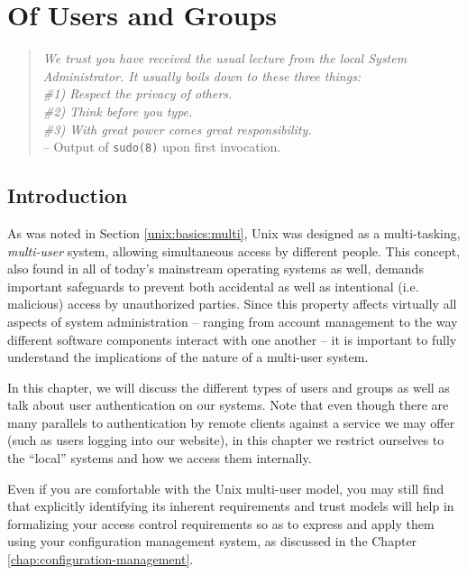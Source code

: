 \chapter{Of Users and Groups}
\label{chap:multi-user}

\begin{quote}

{\em We trust you have received the usual lecture from
the local System Administrator. It usually boils down
to these three things:\\
\#1) Respect the privacy of others.\\
\#2) Think before you type.\\
\#3) With great power comes great responsibility.} \\
-- Output of {\tt sudo(8)} upon first invocation.
\end{quote}


\section{Introduction}
\label{multi-user:introduction}

As was noted in Section \ref{unix:basics:multi}, Unix
was designed as a multi-tasking, {\em multi-user}
system, allowing simultaneous access by different
people.  This concept, also found in all of today's
mainstream operating systems as well, demands
important safeguards to prevent both accidental as
well as intentional (i.e. malicious) access by
unauthorized parties.  Since this property affects
virtually all aspects of system administration --
ranging from account management to the way different
software components interact with one another -- it is
important to fully understand the implications of the
nature of a multi-user system.

In this chapter, we will discuss the different types
of users and groups as well as talk about user
authentication on our systems.  Note that even though
there are many parallels to authentication by remote
clients against a service we may offer (such as users
logging into our website), in this chapter we restrict
ourselves to the ``local'' systems and how we access
them internally.

Even if you are comfortable with the Unix multi-user
model, you may still find that explicitly identifying
its inherent requirements and trust models will help
in formalizing your access control requirements so
as to express and apply them using your configuration
management system, as
discussed in the Chapter
\ref{chap:configuration-management}.


